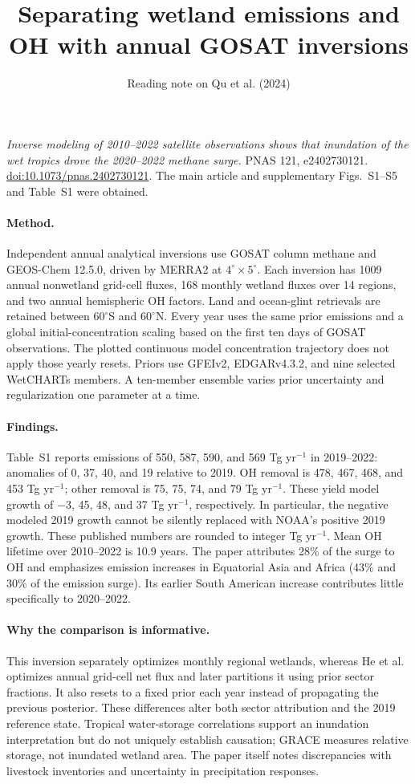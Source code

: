 \documentclass[11pt]{article}
\title{Separating wetland emissions and OH with annual GOSAT inversions}
\author{Reading note on Qu et al. (2024)}\date{}
\begin{document}
\maketitle
\noindent\textit{Inverse modeling of 2010--2022 satellite observations
shows that inundation of the wet tropics drove the 2020--2022 methane surge.}
PNAS 121, e2402730121.
\href{https://doi.org/10.1073/pnas.2402730121}{doi:10.1073/pnas.2402730121}.
The main article and supplementary Figs.~S1--S5 and Table~S1 were obtained.

\paragraph{Method.}
Independent annual analytical inversions use GOSAT column methane and
GEOS-Chem 12.5.0, driven by MERRA2 at $4^\circ\times5^\circ$.
Each inversion has 1009 annual nonwetland grid-cell fluxes, 168 monthly
wetland fluxes over 14 regions, and two annual hemispheric OH factors.
Land and ocean-glint retrievals are retained between $60^\circ$S and
$60^\circ$N. Every year uses the same prior emissions and a global
initial-concentration scaling based on the first ten days of GOSAT
observations. The plotted continuous model concentration trajectory
does not apply those yearly resets. Priors use GFEIv2, EDGARv4.3.2,
and nine selected WetCHARTs members. A ten-member ensemble varies
prior uncertainty and regularization one parameter at a time.

\paragraph{Findings.}
Table~S1 reports emissions of 550, 587, 590, and 569 Tg yr$^{-1}$
in 2019--2022: anomalies of 0, 37, 40, and 19 relative to 2019.
OH removal is 478, 467, 468, and 453 Tg yr$^{-1}$; other removal
is 75, 75, 74, and 79 Tg yr$^{-1}$. These yield model growth of
$-3$, 45, 48, and 37 Tg yr$^{-1}$, respectively. In particular,
the negative modeled 2019 growth cannot be silently replaced with
NOAA's positive 2019 growth. These published numbers are rounded to
integer Tg yr$^{-1}$. Mean OH lifetime over 2010--2022 is 10.9 years.
The paper attributes 28\% of the surge to OH and emphasizes emission
increases in Equatorial Asia and Africa (43\% and 30\% of the
emission surge). Its earlier South American increase contributes little
specifically to 2020--2022.

\paragraph{Why the comparison is informative.}
This inversion separately optimizes monthly regional wetlands, whereas
He et al. optimizes annual grid-cell net flux and later partitions it
using prior sector fractions. It also resets to a fixed prior each year
instead of propagating the previous posterior. These differences alter
both sector attribution and the 2019 reference state. Tropical
water-storage correlations support an inundation interpretation but do
not uniquely establish causation; GRACE measures relative storage,
not inundated wetland area. The paper itself notes discrepancies with
livestock inventories and uncertainty in precipitation responses.
\end{document}
